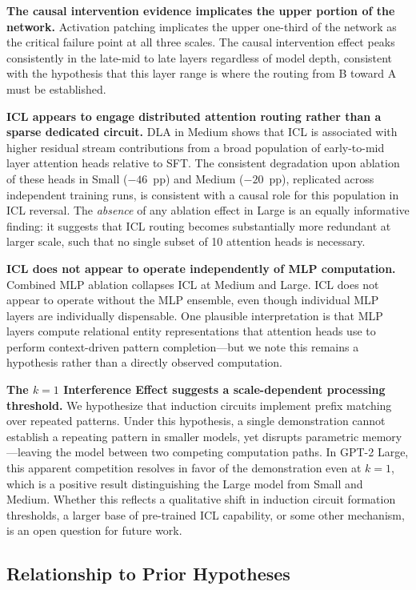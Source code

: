 \documentclass[11pt]{article}
\begin{document}
\textbf{The causal intervention evidence implicates the upper portion of the network.}
Activation patching implicates the upper one-third of the network as the
critical failure point at all three scales. The causal intervention effect peaks
consistently in the late-mid to late layers regardless of model depth, consistent
with the hypothesis that this layer range is where the routing from B toward A
must be established.

\textbf{ICL appears to engage distributed attention routing rather than a sparse dedicated circuit.}
DLA in Medium shows that ICL is associated with higher residual stream
contributions from a broad population of early-to-mid layer attention heads
relative to SFT. The consistent degradation upon ablation of these heads in
Small ($-46$~pp) and Medium ($-20$~pp), replicated across independent training
runs, is consistent with a causal role for this population in ICL reversal.
The \emph{absence} of any ablation effect in Large is an equally informative
finding: it suggests that ICL routing becomes substantially more redundant at
larger scale, such that no single subset of 10 attention heads is necessary.

\textbf{ICL does not appear to operate independently of MLP computation.}
Combined MLP ablation collapses ICL at Medium and Large. ICL does not appear
to operate without the MLP ensemble, even though individual MLP layers are
individually dispensable. One plausible interpretation is that MLP layers
compute relational entity representations that attention heads use to perform
context-driven pattern completion---but we note this remains a hypothesis rather
than a directly observed computation.

\textbf{The $k=1$ Interference Effect suggests a scale-dependent processing threshold.}
We hypothesize that induction circuits implement prefix matching over repeated
patterns. Under this hypothesis, a single demonstration cannot establish a
repeating pattern in smaller models, yet disrupts parametric memory---leaving
the model between two competing computation paths. In GPT-2 Large, this apparent
competition resolves in favor of the demonstration even at $k=1$, which is a
positive result distinguishing the Large model from Small and Medium. Whether
this reflects a qualitative shift in induction circuit formation thresholds, a
larger base of pre-trained ICL capability, or some other mechanism, is an open
question for future work.

\subsection{Relationship to Prior Hypotheses}
\end{document}

